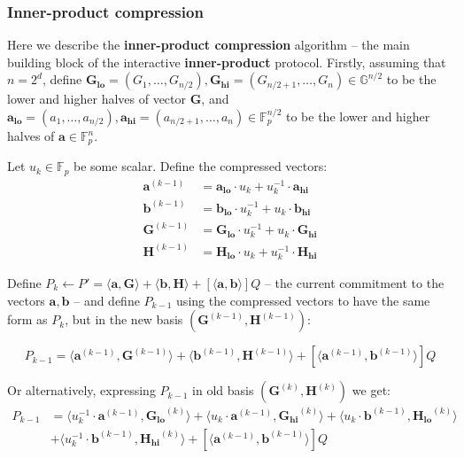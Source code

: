 \documentclass[../../book.tex]{subfiles}
\begin{document}
\subsubsection{Inner-product compression}

Here we describe the \textbf{inner-product compression} algorithm -- the main building block of the interactive \textbf{inner-product} protocol.
Firstly, assuming that $n = 2^d$, define $\mathbf{G_{lo}} = (G_1, \dots, G_{n/2}), \mathbf{G_{hi}} = (G_{n/2+1},\dots, G_n) \in \mathbb{G}^{n/2}$ to be the lower and higher halves of vector $\mathbf{G}$, and $\mathbf{a_{lo}} = (a_1, \dots, a_{n/2}), \mathbf{a_{hi}} = (a_{n/2+1},\dots,a_n) \in \mathbb{F}_p^{n/2}$ to be the lower and higher halves of $\mathbf{a} \in \mathbb{F}_p^{n}$.

Let $u_k \in \mathbb{F}_p$ be some scalar. Define the compressed vectors:
\begin{align*}
    \mathbf{a}^{(k-1)} &= \mathbf{a_{lo}} \cdot u_k + u_k^{-1} \cdot \mathbf{a_{hi}} \\
    \mathbf{b}^{(k-1)} &= \mathbf{b_{lo}} \cdot u_k^{-1} + u_k \cdot \mathbf{b_{hi}} \\
    \mathbf{G}^{(k-1)} &= \mathbf{G_{lo}} \cdot u_k^{-1} + u_k \cdot \mathbf{G_{hi}} \\
    \mathbf{H}^{(k-1)} &= \mathbf{H_{lo}} \cdot u_k + u_k^{-1} \cdot \mathbf{H_{hi}}
\end{align*}

Define $P_k \gets P' =  \langle \mathbf{a,G} \rangle + \langle \mathbf{b,H} \rangle + [\langle \mathbf{a,b} \rangle]Q$ -- the current commitment to the vectors $\mathbf{a,b}$ -- and define $P_{k-1}$ using the compressed vectors to have the same form as $P_k$, but in the new basis $(\mathbf{G}^{(k-1)}, \mathbf{H}^{(k-1)})$:

\begin{equation}
    P_{k-1} = \langle \mathbf{a}^{(k-1)}, \mathbf{G}^{(k-1)} \rangle + \langle \mathbf{b}^{(k-1)}, \mathbf{H}^{(k-1)} \rangle + [\langle \mathbf{a}^{(k-1)}, \mathbf{b}^{(k-1)} \rangle]Q
    \label{eq:p_k_1_from_new_basis}
\end{equation}

Or alternatively, expressing $P_{k-1}$ in old basis $(\mathbf{G}^{(k)}, \mathbf{H}^{(k)})$ we get:
\begin{equation}
    \begin{aligned}
    P_{k-1} &= \langle u_k^{-1} \cdot \mathbf{a}^{(k-1)}, \mathbf{G_{lo}}^{(k)} \rangle + \langle u_k \cdot \mathbf{a}^{(k-1)}, \mathbf{G_{hi}}^{(k)} \rangle + \langle u_k \cdot \mathbf{b}^{(k-1)}, \mathbf{H_{lo}}^{(k)} \rangle \\
    &+ \langle u_k^{-1} \cdot \mathbf{b}^{(k-1)}, \mathbf{H_{hi}}^{(k)} \rangle + [\langle \mathbf{a}^{(k-1)}, \mathbf{b}^{(k-1)} \rangle]Q
    \label{eq:p_k_1_from_old_basis}
    \end{aligned}
\end{equation}
\end{document}
